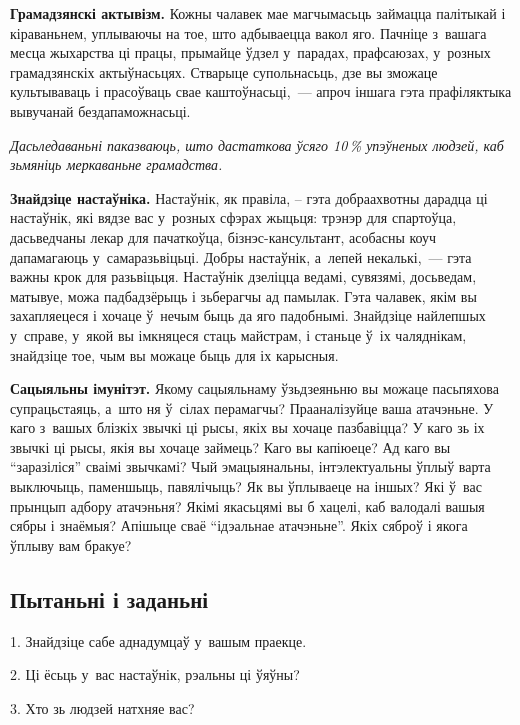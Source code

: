 \textbf{Грамадзянскі актывізм.} Кожны чалавек мае магчымасьць займацца палітыкай і кіраваньнем, уплываючы на тое, што адбываецца вакол яго. Пачніце з~вашага месца жыхарства ці працы, прымайце ўдзел у~парадах, прафсаюзах, у~розных грамадзянскіх актыўнасьцях. Стварыце супольнасьць, дзе вы зможаце культываваць і прасоўваць свае каштоўнасьці,~--- апроч іншага гэта прафіляктыка вывучанай бездапаможнасьці.

\emph{Дасьледаваньні паказваюць, што дастаткова ўсяго 10\,\% упэўненых людзей, каб зьмяніць меркаваньне грамадства.}

\textbf{Знайдзіце настаўніка.} Настаўнік, як правіла, -- гэта добраахвотны дарадца ці настаўнік, які вядзе вас у~розных сфэрах жыцьця: трэнэр для спартоўца, дасьведчаны лекар для пачаткоўца, бізнэс-кансультант, асобасны коуч дапамагаюць у~самаразьвіцьці. Добры настаўнік, а~лепей некалькі,~--- гэта важны крок для разьвіцьця. Настаўнік дзеліцца ведамі, сувязямі, досьведам, матывуе, можа падбадзёрыць і зьберагчы ад памылак. Гэта чалавек, якім вы захапляецеся і хочаце ў~нечым быць да яго падобнымі. Знайдзіце найлепшых у~справе, у~якой вы імкняцеся стаць майстрам, і станьце ў~іх чаляднікам, знайдзіце тое, чым вы можаце быць для іх карысныя.


\textbf{Сацыяльны імунітэт.} Якому сацыяльнаму ўзьдзеяньню вы можаце пасьпяхова супрацьстаяць, а~што ня ў~сілах перамагчы? Прааналізуйце ваша атачэньне. У каго з~вашых блізкіх звычкі ці рысы, якіх вы хочаце пазбавіцца? У каго зь іх звычкі ці рысы, якія вы хочаце займець? Каго вы капіюеце? Ад каго вы ``заразіліся'' сваімі звычкамі? Чый эмацыянальны, інтэлектуальны ўплыў варта выключыць, паменшыць, павялічыць? Як вы ўплываеце на іншых? Які ў~вас прынцып адбору атачэньня? Якімі якасьцямі вы б хацелі, каб валодалі вашыя сябры і знаёмыя? Апішыце сваё ``ідэальнае атачэньне''. Якіх сяброў і якога ўплыву вам бракуе?

\subsection*{Пытаньні і заданьні}

1. Знайдзіце сабе аднадумцаў у~вашым праекце.

2. Ці ёсьць у~вас настаўнік, рэальны ці ўяўны?

3. Хто зь людзей натхняе вас?

